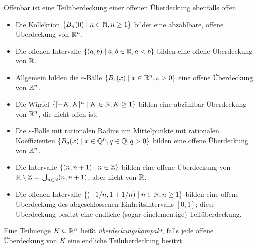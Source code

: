 \documentclass[a4paper,10pt]{article}
\begin{document}
\begin{bem}
 Offenbar ist eine Teilüberdeckung einer offenen Überdeckung ebenfalls offen.
\end{bem}



\begin{bsp}
 \begin{itemize}
  \item
   Die Kollektion $\{B_n(0) \mid n \in \mathbb{N}, n \geq 1\}$ bildet eine abzählbare, offene Überdeckung von $\mathbb{R}^n$.
  \item
   Die offenen Intervalle $\{(a,b) \mid a,b \in \mathbb{R}, a < b\}$ bilden eine offene Überdeckung von $\mathbb{R}$.
  \item
   Allgemein bilden die $\varepsilon$-Bälle $\{B_\varepsilon(x) \mid x \in \mathbb{R}^n, \varepsilon > 0\}$ eine offene Überdeckung von $\mathbb{R}^n$.
  \item
   Die Würfel $\{[-K,K]^n \mid K \in \mathbb{N}, K \geq 1\}$ bilden eine abzählbar Überdeckung von $\mathbb{R}^n$, die nicht offen ist.
  \item
   Die $\varepsilon$-Bälle mit rationalen Radius um Mittelpunkte mit rationalen Koeffizienten $\{B_q(x) \mid x \in \mathbb{Q}^n, q \in \mathbb{Q}, q > 0\}$ bilden eine offene Überdeckung von $\mathbb{R}^n$.
  \item
   Die Intervalle $\{(n,n+1) \mid n \in \mathbb{Z}\}$ bilden eine offene Überdeckung von $\mathbb{R} \setminus \mathbb{Z} = \bigcup_{n \in \mathbb{N}} (n,n+1)$, aber nicht von $\mathbb{R}$.
  \item
   Die offenen Intervalle $\{ (-1/n, 1+1/n) \mid n \in \mathbb{N}, n \geq 1\}$ bilden eine offene Überdeckung des abgeschlossenen Einheitsintervalls $[0,1]$; diese Überdeckung besitzt eine endliche (sogar einelementige) Teilüberdeckung.
 \end{itemize}
\end{bsp}


\begin{defi}
 Eine Teilmenge $K \subseteq \mathbb{R}^n$ heißt \emph{überdeckungskompakt}, falls jede offene Überdeckung von $K$ eine endliche Teilüberdeckung besitzt.
\end{defi}
\end{document}
